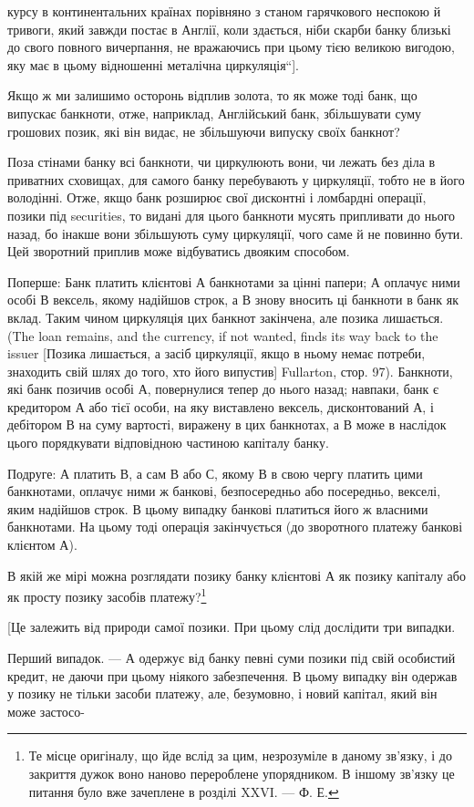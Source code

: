 курсу в континентальних країнах порівняно з станом гарячкового
неспокою й тривоги, який завжди постає в Англії, коли
здається, ніби скарби банку близькі до свого повного вичерпання,
не вражаючись при цьому тією великою вигодою, яку
має в цьому відношенні металічна циркуляція“].

Якщо ж ми залишимо осторонь відплив золота, то як може
тоді банк, що випускає банкноти, отже, наприклад, Англійський
банк, збільшувати суму грошових позик, які він видає, не збільшуючи
випуску своїх банкнот?

Поза стінами банку всі банкноти, чи циркулюють вони, чи
лежать без діла в приватних сховищах, для самого банку перебувають
у циркуляції, тобто не в його володінні. Отже, якщо
банк розширює свої дисконтні і ломбардні операції, позики під
securities, то видані для цього банкноти мусять припливати до
нього назад, бо інакше вони збільшують суму циркуляції, чого
саме й не повинно бути. Цей зворотний приплив може відбуватись
двояким способом.

Поперше: Банк платить клієнтові А банкнотами за цінні папери;
А оплачує ними особі В вексель, якому надійшов строк,
а В знову вносить ці банкноти в банк як вклад. Таким чином
циркуляція цих банкнот закінчена, але позика лишається. (The
loan remains, and the currency, if not wanted, finds its way back
to the issuer [Позика лишається, а засіб циркуляції, якщо в ньому
немає потреби, знаходить свій шлях до того, хто його випустив]
Fullarton, стор. 97). Банкноти, які банк позичив особі А, повернулися
тепер до нього назад; навпаки, банк є кредитором А
або тієї особи, на яку виставлено вексель, дисконтований А,
і дебітором В на суму вартості, виражену в цих банкнотах,
а В може в наслідок цього порядкувати відповідною частиною
капіталу банку.

Подруге: А платить В, а сам В або С, якому В в свою чергу
платить цими банкнотами, оплачує ними ж банкові, безпосередньо
або посередньо, векселі, яким надійшов строк. В цьому
випадку банкові платиться його ж власними банкнотами. На
цьому тоді операція закінчується (до зворотного платежу банкові
клієнтом А).

В якій же мірі можна розглядати позику банку клієнтові А
як позику капіталу або як просту позику засобів платежу?\footnote{
Те місце оригіналу, що йде вслід за цим, незрозуміле в даному зв’язку,
і до закриття дужок воно наново перероблене упорядником. В іншому зв’язку
це питання було вже зачеплене в розділі XXVI. — Ф. Е.
}

[Це залежить від природи самої позики. При цьому слід
дослідити три випадки.

Перший випадок. — А одержує від банку певні суми позики під
свій особистий кредит, не даючи при цьому ніякого забезпечення.
В цьому випадку він одержав у позику не тільки засоби платежу,
але, безумовно, і новий капітал, який він може застосо-